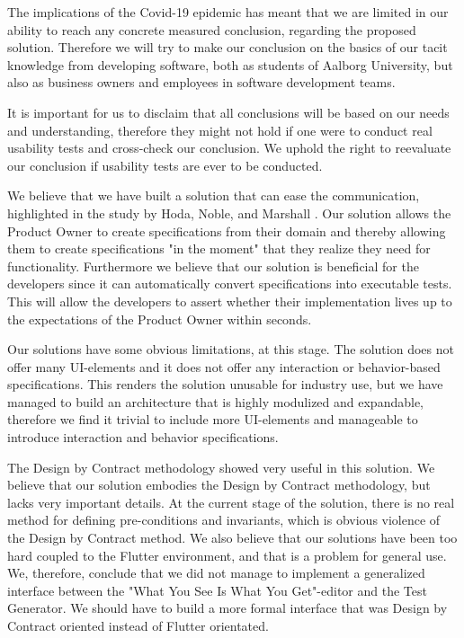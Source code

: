 The implications of the Covid-19 epidemic has meant that we are limited in our ability to reach any concrete measured conclusion, regarding the proposed solution.
Therefore we will try to make our conclusion on the basics of our tacit knowledge from developing software, both as students of Aalborg University, but also as business owners and employees in software development teams.

It is important for us to disclaim that all conclusions will be based on our needs and understanding, therefore they might not hold if one were to conduct real usability tests and cross-check our conclusion.
We uphold the right to reevaluate our conclusion if usability tests are ever to be conducted.

We believe that we have built a solution that can ease the communication, highlighted in the study by Hoda, Noble, and Marshall \cite{Hoda2011TheIO}. 
Our solution allows the Product Owner to create specifications from their domain and thereby allowing them to create specifications "in the moment" that they realize they need for functionality.
Furthermore we believe that our solution is beneficial for the developers since it can automatically convert specifications into executable tests.
This will allow the developers to assert whether their implementation lives up to the expectations of the Product Owner within seconds.

Our solutions have some obvious limitations, at this stage.
The solution does not offer many UI-elements and it does not offer any interaction or behavior-based specifications.
This renders the solution unusable for industry use, but we have managed to build an architecture that is highly modulized and expandable, therefore we find it trivial to include more UI-elements and manageable to introduce interaction and behavior specifications.

The Design by Contract methodology showed very useful in this solution.
We believe that our solution embodies the Design by Contract methodology, but lacks very important details.
At the current stage of the solution, there is no real method for defining pre-conditions and invariants, which is obvious violence of the Design by Contract method.
We also believe that our solutions have been too hard coupled to the Flutter environment, and that is a problem for general use. 
We, therefore, conclude that we did not manage to implement a generalized interface between the "What You See Is What You Get"-editor and the Test Generator.
We should have to build a more formal interface that was Design by Contract oriented instead of Flutter orientated.